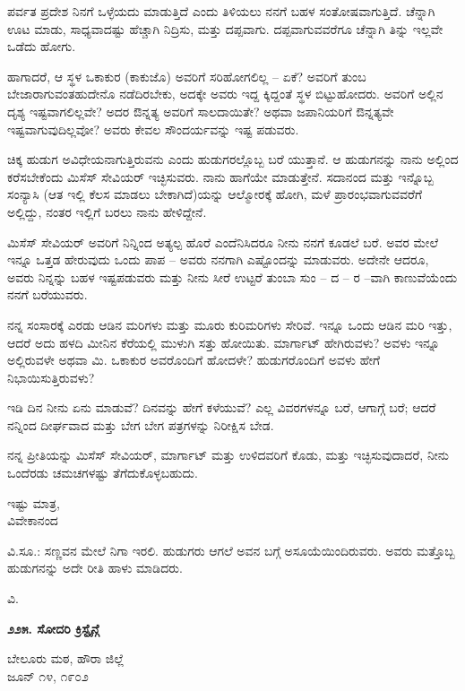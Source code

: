 ಪರ್ವತ ಪ್ರದೇಶ ನಿನಗೆ ಒಳ್ಳೆಯದು ಮಾಡುತ್ತಿದೆ ಎಂದು ತಿಳಿಯಲು ನನಗೆ ಬಹಳ ಸಂತೋಷವಾಗುತ್ತಿದೆ. ಚೆನ್ನಾಗಿ ಊಟ ಮಾಡು, ಸಾಧ್ಯವಾದಷ್ಟು ಹೆಚ್ಚಾಗಿ ನಿದ್ರಿಸು, ಮತ್ತು ದಪ್ಪವಾಗು. ದಪ್ಪವಾಗುವವರೆಗೂ ಚೆನ್ನಾಗಿ ತಿನ್ನು ಇಲ್ಲವೇ ಒಡೆದು ಹೋಗು.

ಹಾಗಾದರೆ, ಆ ಸ್ಥಳ ಒಕಾಕುರ (ಕಾಕುಜೊ) ಅವರಿಗೆ ಸರಿಹೋಗಲಿಲ್ಲ – ಏಕೆ? ಅವರಿಗೆ ತುಂಬ ಬೇಜಾರಾಗುವಂತಹುದೇನೊ ನಡೆದಿರಬೇಕು, ಅದಕ್ಕೇ ಅವರು ಇದ್ದ ಕ್ಕಿದ್ದಂತೆ ಸ್ಥಳ ಬಿಟ್ಟುಹೋದರು. ಅವರಿಗೆ ಅಲ್ಲಿನ ದೃಶ್ಯ ಇಷ್ಟವಾಗಲಿಲ್ಲವೇ? ಅದರ ಔನ್ನತ್ಯ ಅವರಿಗೆ ಸಾಲದಾಯಿತೇ? ಅಥವಾ ಜಪಾನಿಯರಿಗೆ ಔನ್ನತ್ಯವೇ ಇಷ್ಟವಾಗುವುದಿಲ್ಲವೋ? ಅವರು ಕೇವಲ ಸೌಂದರ್ಯವನ್ನು ಇಷ್ಟ ಪಡುವರು.

ಚಿಕ್ಕ ಹುಡುಗ ಅವಿಧೇಯನಾಗುತ್ತಿರುವನು ಎಂದು ಹುಡುಗರಲ್ಲೊಬ್ಬ ಬರೆ ಯುತ್ತಾನೆ. ಆ ಹುಡುಗನನ್ನು ನಾನು ಅಲ್ಲಿಂದ ಕರೆಸಬೇಕೆಂದು ಮಿಸೆಸ್ ಸೇವಿಯರ್ ಇಚ್ಛಿಸುವರು. ನಾನು ಹಾಗೆಯೇ ಮಾಡುತ್ತೇನೆ. ಸದಾನಂದ ಮತ್ತು ಇನ್ನೊಬ್ಬ ಸಂನ್ಯಾಸಿ (ಆತ ಇಲ್ಲಿ ಕೆಲಸ ಮಾಡಲು ಬೇಕಾಗಿದೆ)ಯನ್ನು ಆಲ್ಮೋರಕ್ಕೆ ಹೋಗಿ, ಮಳೆ ಪ್ರಾರಂಭವಾಗುವವರೆಗೆ ಅಲ್ಲಿದ್ದು, ನಂತರ ಇಲ್ಲಿಗೆ ಬರಲು ನಾನು ಹೇಳಿದ್ದೇನೆ.

ಮಿಸೆಸ್ ಸೇವಿಯರ್ ಅವರಿಗೆ ನಿನ್ನಿಂದ ಅತ್ಯಲ್ಪ ಹೊರೆ ಎಂದೆನಿಸಿದರೂ ನೀನು ನನಗೆ ಕೂಡಲೆ ಬರೆ. ಅವರ ಮೇಲೆ ಇನ್ನೂ ಒತ್ತಡ ಹೇರುವುದು ಒಂದು ಪಾಪ – ಅವರು ನನಗಾಗಿ ಎಷ್ಟೊಂದನ್ನು ಮಾಡುವರು. ಅದೇನೇ ಆದರೂ, ಅವರು ನಿನ್ನನ್ನು ಬಹಳ ಇಷ್ಟಪಡುವರು ಮತ್ತು ನೀನು ಸೀರೆ ಉಟ್ಟರೆ ತುಂಬಾ ಸುಂ – ದ – ರ –ವಾಗಿ ಕಾಣುವೆಯೆಂದು ನನಗೆ ಬರೆಯುವರು.

ನನ್ನ ಸಂಸಾರಕ್ಕೆ ಎರಡು ಆಡಿನ ಮರಿಗಳು ಮತ್ತು ಮೂರು ಕುರಿಮರಿಗಳು ಸೇರಿವೆ. ಇನ್ನೂ ಒಂದು ಆಡಿನ ಮರಿ ಇತ್ತು, ಆದರೆ ಅದು ಹಳದಿ ಮೀನಿನ ಕೆರೆಯಲ್ಲಿ ಮುಳುಗಿ ಸತ್ತು ಹೋಯಿತು. ಮಾರ್ಗಾಟ್ ಹೇಗಿರುವಳು? ಅವಳು ಇನ್ನೂ ಅಲ್ಲಿರುವಳೇ ಅಥವಾ ಮಿ. ಒಕಾಕುರ ಅವರೊಂದಿಗೆ ಹೋದಳೇ? ಹುಡುಗರೊಂದಿಗೆ ಅವಳು ಹೇಗೆ ನಿಭಾಯಿಸುತ್ತಿರುವಳು?

ಇಡಿ ದಿನ ನೀನು ಏನು ಮಾಡುವೆ? ದಿನವನ್ನು ಹೇಗೆ ಕಳೆಯುವೆ? ಎಲ್ಲ ವಿವರಗಳನ್ನೂ ಬರೆ, ಆಗಾಗ್ಗೆ ಬರೆ; ಆದರೆ ನನ್ನಿಂದ ದೀರ್ಘವಾದ ಮತ್ತು ಬೇಗ ಬೇಗ ಪತ್ರಗಳನ್ನು ನಿರೀಕ್ಷಿಸ ಬೇಡ.

ನನ್ನ ಪ್ರೀತಿಯನ್ನು ಮಿಸೆಸ್ ಸೇವಿಯರ್, ಮಾರ್ಗಾಟ್ ಮತ್ತು ಉಳಿದವರಿಗೆ ಕೊಡು, ಮತ್ತು ಇಚ್ಛಿಸುವುದಾದರೆ, ನೀನು ಒಂದೆರಡು ಚಮಚಗಳಷ್ಟು ತೆಗೆದುಕೊಳ್ಳಬಹುದು.

\begin{flushright}
ಇಷ್ಟು ಮಾತ್ರ,\\ವಿವೇಕಾನಂದ
\end{flushright}

ವಿ.ಸೂ.: ಸಣ್ಣವನ ಮೇಲೆ ನಿಗಾ ಇರಲಿ. ಹುಡುಗರು ಆಗಲೆ ಅವನ ಬಗ್ಗೆ ಅಸೂಯೆಯಿಂದಿರುವರು. ಅವರು ಮತ್ತೊಬ್ಬ ಹುಡುಗನನ್ನು ಅದೇ ರೀತಿ ಹಾಳು ಮಾಡಿದರು.

\begin{flushright}
ವಿ.
\end{flushright}

\begin{center}
\textbf{೨೨೫. ಸೋದರಿ ಕ್ರಿಸ್ಟೈನ್ಗೆ}
\end{center}

\begin{flushright}
ಬೇಲೂರು ಮಠ, ಹೌರಾ ಜಿಲ್ಲೆ\\ಜೂನ್ ೧೪, ೧೯೦೨
\end{flushright}

